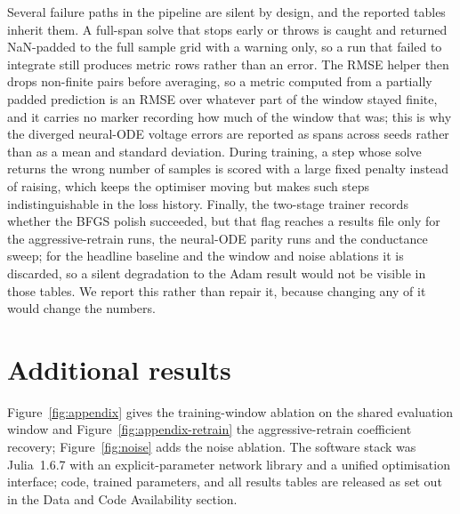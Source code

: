 \documentclass{article}
\begin{document}
Several failure paths in the pipeline are silent by design, and the reported
tables inherit them. A full-span solve that stops early or throws is caught and
returned NaN-padded to the full sample grid with a warning only, so a run that
failed to integrate still produces metric rows rather than an error. The RMSE
helper then drops non-finite pairs before averaging, so a metric computed from a
partially padded prediction is an RMSE over whatever part of the window stayed
finite, and it carries no marker recording how much of the window that was; this
is why the diverged neural-ODE voltage errors are reported as spans across seeds
rather than as a mean and standard deviation. During training, a step whose solve
returns the wrong number of samples is scored with a large fixed penalty instead
of raising, which keeps the optimiser moving but makes such steps
indistinguishable in the loss history. Finally, the two-stage trainer records
whether the BFGS polish succeeded, but that flag reaches a results file only for
the aggressive-retrain runs, the neural-ODE parity runs and the conductance
sweep; for the headline baseline and the window and noise ablations it is
discarded, so a silent degradation to the Adam result would not be
visible in those tables. We report this rather than repair it, because changing
any of it would change the numbers.

\section{Additional results}
\label{app:extra}

Figure~\ref{fig:appendix} gives the training-window ablation on the shared
evaluation window and Figure~\ref{fig:appendix-retrain} the aggressive-retrain
coefficient recovery; Figure~\ref{fig:noise} adds the noise ablation. The software
stack was Julia~1.6.7 with an explicit-parameter network library and a unified
optimisation interface; code, trained parameters, and all results tables are
released as set out in the Data and Code Availability section.
\end{document}
